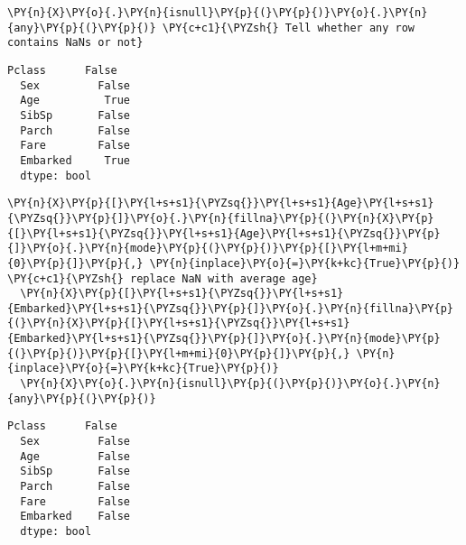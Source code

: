       \begin{tcolorbox}[breakable, size=fbox, boxrule=1pt, pad at break*=1mm,colback=cellbackground, colframe=cellborder]
  \begin{Verbatim}[commandchars=\\\{\}]
  \PY{n}{X}\PY{o}{.}\PY{n}{isnull}\PY{p}{(}\PY{p}{)}\PY{o}{.}\PY{n}{any}\PY{p}{(}\PY{p}{)} \PY{c+c1}{\PYZsh{} Tell whether any row contains NaNs or not}
  \end{Verbatim}
  \end{tcolorbox}

              \begin{tcolorbox}[breakable, size=fbox, boxrule=.5pt, pad at break*=1mm, opacityfill=0]
  \begin{Verbatim}[commandchars=\\\{\}]
  Pclass      False
  Sex         False
  Age          True
  SibSp       False
  Parch       False
  Fare        False
  Embarked     True
  dtype: bool
  \end{Verbatim}
  \end{tcolorbox}
          
      \begin{tcolorbox}[breakable, size=fbox, boxrule=1pt, pad at break*=1mm,colback=cellbackground, colframe=cellborder]
  \begin{Verbatim}[commandchars=\\\{\}]
  \PY{n}{X}\PY{p}{[}\PY{l+s+s1}{\PYZsq{}}\PY{l+s+s1}{Age}\PY{l+s+s1}{\PYZsq{}}\PY{p}{]}\PY{o}{.}\PY{n}{fillna}\PY{p}{(}\PY{n}{X}\PY{p}{[}\PY{l+s+s1}{\PYZsq{}}\PY{l+s+s1}{Age}\PY{l+s+s1}{\PYZsq{}}\PY{p}{]}\PY{o}{.}\PY{n}{mode}\PY{p}{(}\PY{p}{)}\PY{p}{[}\PY{l+m+mi}{0}\PY{p}{]}\PY{p}{,} \PY{n}{inplace}\PY{o}{=}\PY{k+kc}{True}\PY{p}{)}  \PY{c+c1}{\PYZsh{} replace NaN with average age}
  \PY{n}{X}\PY{p}{[}\PY{l+s+s1}{\PYZsq{}}\PY{l+s+s1}{Embarked}\PY{l+s+s1}{\PYZsq{}}\PY{p}{]}\PY{o}{.}\PY{n}{fillna}\PY{p}{(}\PY{n}{X}\PY{p}{[}\PY{l+s+s1}{\PYZsq{}}\PY{l+s+s1}{Embarked}\PY{l+s+s1}{\PYZsq{}}\PY{p}{]}\PY{o}{.}\PY{n}{mode}\PY{p}{(}\PY{p}{)}\PY{p}{[}\PY{l+m+mi}{0}\PY{p}{]}\PY{p}{,} \PY{n}{inplace}\PY{o}{=}\PY{k+kc}{True}\PY{p}{)}
  \PY{n}{X}\PY{o}{.}\PY{n}{isnull}\PY{p}{(}\PY{p}{)}\PY{o}{.}\PY{n}{any}\PY{p}{(}\PY{p}{)}
  \end{Verbatim}
  \end{tcolorbox}

              \begin{tcolorbox}[breakable, size=fbox, boxrule=.5pt, pad at break*=1mm, opacityfill=0]
  \begin{Verbatim}[commandchars=\\\{\}]
  Pclass      False
  Sex         False
  Age         False
  SibSp       False
  Parch       False
  Fare        False
  Embarked    False
  dtype: bool
  \end{Verbatim}
  \end{tcolorbox}
          

